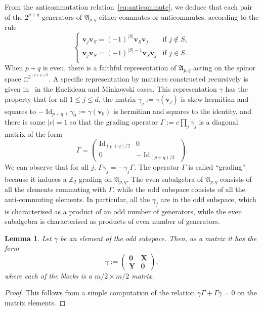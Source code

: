 \documentclass[10pt]{amsart}
\newtheorem{lemm}[theo]{Lemma}\newtheorem{prop}[theo]{Proposition}\newtheorem{coro}[theo]{Corollary}\newtheorem{conj}[theo]{Conjecture}
\theoremstyle{definition}\newtheorem{defi}[theo]{Definition}\newtheorem{rema}[theo]{Remark}\newtheorem{exam}[theo]{Example}\newtheorem{nota}[theo]{Notation}
\DeclareMathOperator{\Id}{Id}
\newcommand{\C}{\mathbb C}
\newcommand{\Z}{\mathbb Z}
\newcommand{\BX}{\mathbf X}
\newcommand{\BY}{\mathbf Y}
\newcommand{\bv}{\mathbf v}
\newcommand{\FA}{\mathfrak A}
\newcommand{\abs}[1]{\left\lvert #1 \right\rvert}
\begin{document}
From the anticommutation relation~\eqref{eq:anticommute}, we deduce that each pair of the $2^{p+q}$ generators of $\FA_{p,q}$ either commutes or anticommutes, according to the rule
\begin{equation}
\begin{cases}
\bv_j \bv_S = (-1)^{\abs S} \bv_S \bv_j & \text{if } j \not \in S, \\
\bv_j \bv_S = (-1)^{\abs S - 1} \bv_S \bv_j & \text{if } j \in S. \\
\end{cases}
\end{equation}
When $p+q$ is even, there is a faithful representation of $\FA_{p,q}$ acting on the spinor space $\C^{2^{(p+q)/2}}$. A specific representation by matrices constructed recursively is given in~\cite{Upmeier} in the Euclidean and Minkowski cases. This representation $\gamma$ has the property that for all $1 \le j \le d$, the matrix $\gamma_j := \gamma(\bv_j)$ is skew-hermitian and squares to $-\Id_{p+q}$, $\gamma_0 := \gamma(\bv_0)$ is hermitian and squares to the identity, and there is some $\abs c = 1$ so that the grading operator $\Gamma := c \prod_j \gamma_j$ is a diagonal matrix of the form
\begin{equation}
\Gamma =
\begin{pmatrix}
\Id_{(p+q)/2} & 0 \\
0 & - \Id_{(p+q)/2}
\end{pmatrix}.
\end{equation}
We can observe that for all $j$, $\Gamma \gamma_j = -
\gamma_j \Gamma$. The operator $\Gamma$ is called ``grading'' because it induces a $\Z_2$ grading on $\FA_{p,q}$. The even subalgebra of $\FA_{p,q}$ consists of all the elements commuting with $\Gamma$, while the odd subspace consists of all the anti-commuting elements. In particular, all the $\gamma_j$ are in the odd subspace, which is characterised as a product of an odd number of generators, while the even subalgebra is characterised as products of even number of generators.

\begin{lemm}\label{lem:anticom}
Let $\gamma$ be an element of the odd subspace. Then, as a matrix it has the form
\begin{equation}
\gamma :=
\begin{pmatrix}
\boldsymbol 0 & \BX \\
\BY & \boldsymbol 0
\end{pmatrix},
\end{equation}
where each of the blocks is a $m/2 \times m/2$ matrix.
\end{lemm}
\begin{proof}
This follows from a simple computation of the relation $\gamma \Gamma +
\Gamma \gamma = 0$ on the matrix elements.
\end{proof}
\end{document}
